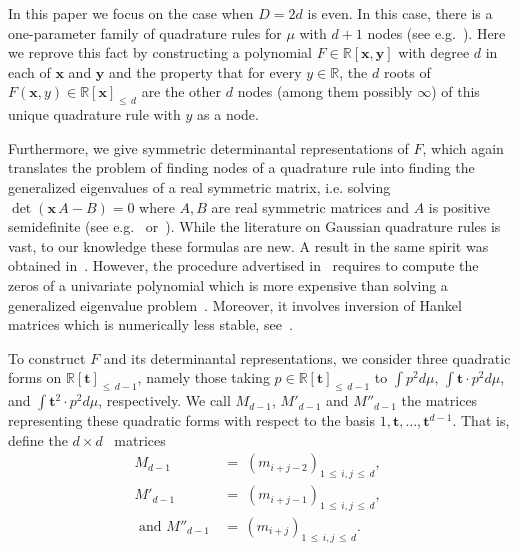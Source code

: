 \documentclass[11pt]{article}
\theoremstyle{definition}
\numberwithin{equation}{section}
\numberwithin{figure}{section}
\numberwithin{table}{section}
\newcommand\R{\mathbb R}
\renewcommand\t{\mathbf{t}}
\newcommand\x{\mathbf{x}}
\newcommand\y{\mathbf{y}}
\newcommand*{\MK}{\mkern 2mu}
\begin{document}
In this paper we focus on the case when $D=2d$ is even. In this case, there is a one-parameter family of quadrature rules for $\mu$ with $d+1$ nodes (see e.g.~\cite[Theorem~9.7]{sch}). Here we reprove this fact by constructing a polynomial $F\in \R[\x,\y]$ with degree $d$ in each of $\x$ and $\y$ and the property that for every $y\in \R$, the $d$ roots of $F(\x,y)\in \R[\x]_{ \leq\,d}$ are the other $d$ nodes (among them possibly $\infty$) of this unique quadrature rule with $y$ as a node.

Furthermore, we give symmetric determinantal representations of $F$, which again translates the problem of finding nodes of a quadrature rule into finding the generalized eigenvalues of a real symmetric matrix,
i.e. solving $\det(\x\,A-B)=0$ where $A,B$ are real symmetric matrices and $A$ is positive semidefinite (see e.g.~\cite[Chapter~4]{eig} or~\cite{golub}). While the literature on Gaussian quadrature rules is vast, to our knowledge these formulas are new. A result in the same spirit was obtained in~\cite[Proposition~3.3]{curto}. However, the procedure advertised in~\cite[Theorem~3.10$\MK$(ii)]{curto} requires to compute the zeros of a univariate polynomial which is more expensive than solving a generalized eigenvalue problem~\cite[p.~1225]{golub}. Moreover, it involves inversion of Hankel matrices which is numerically less stable, see~\cite{illhankel}.


To construct $F$ and its determinantal representations, we consider three quadratic forms on $\R[\t]_{\leq\,d-1}$, namely those taking $p\in \R[\t]_{\leq\,d-1}$ to $\int p^2d\mu$, $\int \t \cdot p^2d\mu$, and $\int \t^2 \cdot p^2d\mu$, respectively. We call $M_{d-1}$, $M'_{d-1}$ and $M''_{d-1}$ the matrices representing these quadratic forms with respect to the basis $1,\t,\hdots, \t^{d-1}$. That is, define the $d\times d$ ~matrices
\begin{equation}\label{eq:matrices}
\begin{aligned}
M_{d-1}\; &= \; (m_{i+j-2})_{1\,\leq\,i,j\, \leq\,d}, \\
M'_{d-1} \; &= \; (m_{i+j-1})_{1\,\leq\,i,j\, \leq\,d}, \; \\ 
\text{ and } M''_{d-1} \,& = \, (m_{i+j})_{1\,\leq\,i,j\,\leq\,d}.
\end{aligned}
\end{equation}
\end{document}
